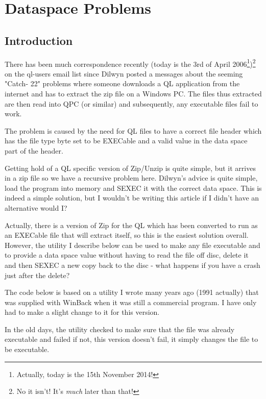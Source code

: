 \chapter{Dataspace Problems}

\section{Introduction}
\label{ch15-intro}%

There has been much correspondence recently (today is the 3rd of
    April 2006\footnote{Actually, today is the 15th November 2014!})\footnote{No it isn't! It's \emph{much} later than that!} on the ql-{}users email list since Dilwyn posted a messages
    about the seeming "Catch-{} 22" problems where someone downloads a QL
    application from the internet and has to extract the zip file on a Windows
    PC. The files thus extracted are then read into QPC (or similar) and
    subsequently, any executable files fail to work.

The problem is caused by the need for QL files to have a correct
    file header which has the file type byte set to be EXECable and a valid
    value in the data space part of the header.

Getting hold of a QL specific version of Zip/Unzip is quite simple,
    but it arrives in a zip file so we have a recursive problem here. Dilwyn's
    advice is quite simple, load the program into memory and SEXEC it with the
    correct data space. This is indeed a simple solution, but I wouldn't be
    writing this article if I didn't have an alternative would I?

Actually, there is a version of Zip for the QL which has been
    converted to run as an EXECable file that will extract itself, so this is
    the easiest solution overall. However, the utility I describe below can be
    used to make any file executable and to provide a data space value without
    having to read the file off disc, delete it and then SEXEC a new copy back
    to the disc -{} what happens if you have a crash just after the
    delete?

The code below is based on a utility I wrote many years ago (1991
    actually) that was supplied with WinBack when it was still a commercial
    program. I have only had to make a slight change to it for this
    version.

In the old days, the utility checked to make sure that the file was
    already executable and failed if not, this version doesn't fail, it simply
    changes the file to be executable.


